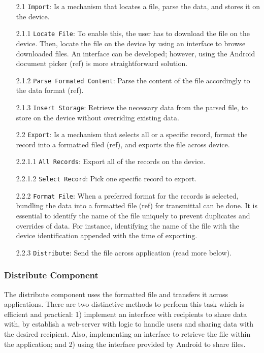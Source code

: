 \begin{itemize}
    \item[2.1] \verb|Import|: Is a mechanism that locates a file, parse the data, and stores it on the device.
    \item[2.1.1] \verb|Locate File|: To enable this, the user has to download the file on the device. Then, locate the file on the device by using an interface to browse downloaded files. An interface can be developed; however, using the Android document picker (ref) is more straightforward solution.
    \item[2.1.2] \verb|Parse Formated Content|: Parse the content of the file accordingly to the data format (ref).
    \item[2.1.3] \verb|Insert Storage|: Retrieve the necessary data from the parsed file, to store on the device without overriding existing data.   
    \item[2.2] \verb|Export|: Is a mechanism that selects all or a specific record, format the record into a formatted filed (ref), and exports the file across device. 
    \item[2.2.1.1] \verb|All Records|: Export all of the records on the device.
    \item[2.2.1.2] \verb|Select Record|: Pick one specific record to export. 
    \item[2.2.2] \verb|Format File|: When a preferred format for the records is selected, bundling the data into a formatted file (ref) for transmittal can be done. It is essential to identify the name of the file uniquely to prevent duplicates and overrides of data. For instance, identifying the name of the file with the device identification appended with the time of exporting. 
    \item[2.2.3] \verb|Distribute|: Send the file across application (read more below).
\end{itemize}

\subsubsection{Distribute Component}
The distribute component uses the formatted file and transfers it across applications. There are two distinctive methods to perform this task which is efficient and practical: 1) implement an interface with recipients to share data with, by establish a web-server with logic to handle users and sharing data with the desired recipient. Also, implementing an interface to retrieve the file within the application;  and 2) using the interface provided by Android to share files. 

